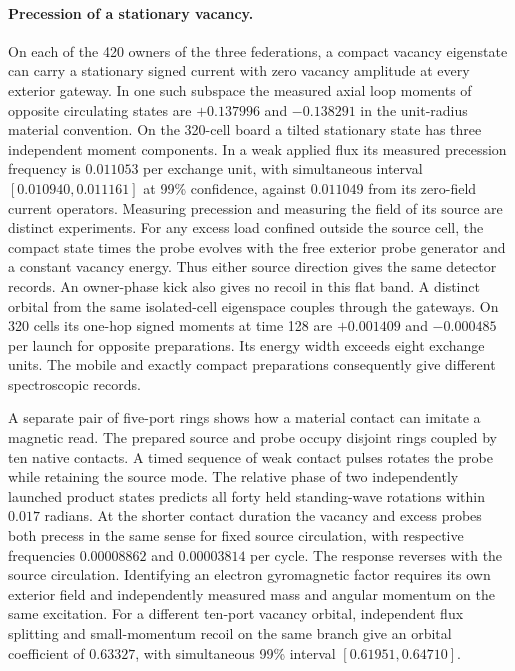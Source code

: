 \documentclass[11pt]{article}
\theoremstyle{definition}
\theoremstyle{remark}
\theoremstyle{plain}
\begin{document}
\paragraph{Precession of a stationary vacancy.}
On each of the 420 owners of the three federations, a compact
vacancy eigenstate can carry a stationary signed current with zero
vacancy amplitude at every exterior gateway. In one such subspace
the measured axial loop moments of opposite circulating states are
$+0.137996$ and $-0.138291$ in the unit-radius material convention.
On the 320-cell board a tilted stationary state has three independent
moment components. In a weak applied flux its measured precession
frequency is $0.011053$ per exchange unit, with simultaneous interval
$[0.010940,0.011161]$ at 99\% confidence, against $0.011049$ from
its zero-field current operators. Measuring precession and measuring
the field of its source are distinct experiments. For any excess load
confined outside the source cell, the compact state times the probe
evolves with the free exterior probe generator and a constant vacancy
energy. Thus either source direction gives the same detector records.
An owner-phase kick also gives no recoil in this flat band. A distinct
orbital from the same isolated-cell eigenspace couples through the
gateways. On 320 cells its one-hop signed moments at time 128 are
$+0.001409$ and $-0.000485$ per launch for opposite preparations. Its
energy width exceeds eight exchange units. The mobile and exactly
compact preparations consequently give different spectroscopic records.

A separate pair of five-port rings shows how a material contact can
imitate a magnetic read. The prepared source and probe occupy disjoint
rings coupled by ten native contacts. A timed sequence of weak contact
pulses rotates the probe while retaining the source mode. The relative
phase of two independently launched product states predicts all forty
held standing-wave rotations within $0.017$ radians. At the shorter
contact duration the vacancy and excess probes both precess in the
same sense for fixed source circulation, with respective frequencies
$0.00008862$ and $0.00003814$ per cycle. The response reverses with
the source circulation. Identifying an electron gyromagnetic factor
requires its own exterior field and independently measured mass and
angular momentum on the same excitation. For a different ten-port
vacancy orbital, independent flux splitting and small-momentum recoil
on the same branch give an orbital coefficient of $0.63327$, with
simultaneous 99\% interval $[0.61951,0.64710]$.
\end{document}

